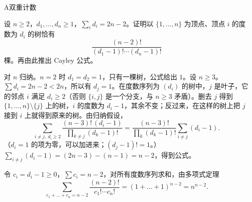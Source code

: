 \begin{exercises}{A}{双重计数}
\item\label{ex:double-counting:A4} 设 $n\geqslant2$，$d_1,\dots,d_n\geqslant1$，$\sum_id_i=2n-2$。证明以 $\{1,\dots,n\}$ 为顶点、顶点 $i$ 的度数为 $d_i$ 的树恰有
\[
\frac{(n-2)!}{(d_1-1)!\cdots(d_n-1)!}
\]
棵。再由此推出 Cayley 公式。
\begin{solution}
对 $n$ 归纳。$n=2$ 时 $d_1=d_2=1$，只有一棵树，公式给出 $1$。设 $n\geqslant3$。$\sum d_i=2n-2<2n$，所以有 $d_j=1$。在度数序列为 $(d_i)$ 的树中，$j$ 是叶子，它的邻点 $i$ 满足 $d_i\geqslant2$（否则 $\{i,j\}$ 是一个分支，与 $n\geqslant3$ 矛盾）。删去 $j$ 得到 $\{1,\dots,n\}\setminus\{j\}$ 上的树，$i$ 的度数为 $d_i-1$，其余不变；反过来，在这样的树上把 $j$ 接到 $i$ 上就得到原来的树。由归纳假设，
\[
\sum_{i\neq j,\ d_i\geqslant2}\frac{(n-3)!\,(d_i-1)}{\prod_{k\neq j}(d_k-1)!}=\frac{(n-3)!}{\prod_{k}(d_k-1)!}\sum_{i\neq j}(d_i-1).
\]
（$d_i=1$ 的项为零，可以加进来；$(d_j-1)!=1$。）$\sum_{i\neq j}(d_i-1)=(2n-3)-(n-1)=n-2$，得到公式。

令 $c_i=d_i-1\geqslant0$，$\sum c_i=n-2$，对所有度数序列求和，由多项式定理
\[
\sum_{c_1+\dots+c_n=n-2}\frac{(n-2)!}{c_1!\cdots c_n!}=(1+\dots+1)^{n-2}=n^{n-2}.
\]
\end{solution}
\end{exercises}
